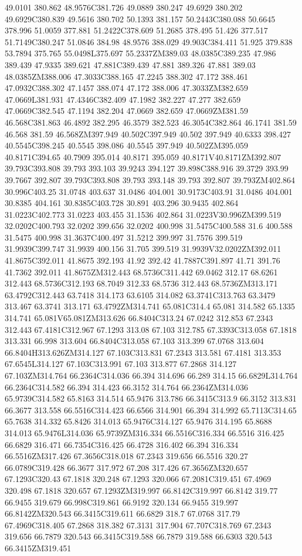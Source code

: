 49.0101 380.862 48.9576C381.726 49.0889 380.247 49.6929 380.202 49.6929C380.839 49.5616 380.702 50.1393 381.157 50.2443C380.088 50.6645 378.996 51.0059 377.881 51.2422C378.609 51.2685 378.495 51.426 377.517 51.7149C380.247 51.0846 384.98 48.9576 388.029 49.903C384.411 51.925 379.838 53.7894 375.765 55.0498L375.697 55.2337ZM389.03 48.0385C389.235 47.986 389.439 47.9335 389.621 47.881C389.439 47.881 389.326 47.881 389.03 48.0385ZM388.006 47.3033C388.165 47.2245 388.302 47.172 388.461 47.0932C388.302 47.1457 388.074 47.172 388.006 47.3033ZM382.659 47.0669L381.931 47.4346C382.409 47.1982 382.227 47.277 382.659 47.0669C382.545 47.1194 382.204 47.0669 382.659 47.0669ZM381.59 46.568C381.863 46.4892 382.295 46.3579 382.523 46.3054C382.864 46.1741 381.59 46.568 381.59 46.568ZM397.949 40.502C397.949 40.502 397.949 40.6333 398.427 40.5545C398.245 40.5545 398.086 40.5545 397.949 40.502ZM395.059 40.8171C394.65 40.7909 395.014 40.8171 395.059 40.8171V40.8171ZM392.807 39.793C393.808 39.793 393.103 39.9243 394.127 39.898C388.916 39.3729 393.99 39.7667 392.807 39.793C393.808 39.793 393.148 39.793 392.807 39.793ZM402.864 30.996C403.25 31.0748 403.637 31.0486 404.001 30.9173C403.91 31.0486 404.001 30.8385 404.161 30.8385C403.728 30.891 403.296 30.9435 402.864 31.0223C402.773 31.0223 403.455 31.1536 402.864 31.0223V30.996ZM399.519 32.0202C400.793 32.0202 399.656 32.0202 400.998 31.5475C400.588 31.6 400.588 31.5475 400.998 31.3637C400.497 31.5212 399.997 31.7576 399.519 31.9939C399.747 31.9939 400.156 31.705 399.519 31.9939V32.0202ZM392.011 41.8675C392.011 41.8675 392.193 41.92 392.42 41.7887C391.897 41.71 391.76 41.7362 392.011 41.8675ZM312.443 68.5736C311.442 69.0462 312.17 68.6261 312.443 68.5736C312.193 68.7049 312.33 68.5736 312.443 68.5736ZM313.171 63.4792C312.443 63.7418 314.173 63.6105 314.082 63.3741C313.763 63.3479 313.467 63.3741 313.171 63.4792ZM314.741 65.081C314.4 65.081 314.582 65.1335 314.741 65.081V65.081ZM313.626 66.8404C313.24 67.0242 312.853 67.2343 312.443 67.4181C312.967 67.1293 313.08 67.103 312.785 67.3393C313.058 67.1818 313.331 66.998 313.604 66.8404C313.058 67.103 313.399 67.0768 313.604 66.8404H313.626ZM314.127 67.103C313.831 67.2343 313.581 67.4181 313.353 67.6545L314.127 67.103C313.991 67.103 313.877 67.2868 314.127 67.103ZM314.764 66.2364C314.036 66.394 314.696 66.289 314.15 66.6829L314.764 66.2364C314.582 66.394 314.423 66.3152 314.764 66.2364ZM314.036 65.9739C314.582 65.8163 314.514 65.9476 313.786 66.3415C313.9 66.3152 313.831 66.3677 313.558 66.5516C314.423 66.6566 314.901 66.394 314.992 65.7113C314.65 65.7638 314.332 65.8426 314.013 65.9476C314.127 65.9476 314.195 65.8688 314.013 65.9476L314.036 65.9739ZM316.334 66.5516C316.334 66.5516 316.425 66.6829 316.471 66.7354C316.425 66.4728 316.402 66.394 316.334 66.5516ZM317.426 67.3656C318.018 67.2343 319.656 66.5516 320.27 66.0789C319.428 66.3677 317.972 67.208 317.426 67.3656ZM320.657 67.1293C320.43 67.1818 320.248 67.1293 320.066 67.2081C319.451 67.4969 320.498 67.1818 320.657 67.1293ZM319.997 66.8142C319.997 66.8142 319.77 66.9455 319.679 66.998C319.861 66.9192 320.134 66.9455 319.997 66.8142ZM320.543 66.3415C319.611 66.6829 318.7 67.0768 317.79 67.4969C318.405 67.2868 318.382 67.3131 317.904 67.707C318.769 67.2343 319.656 66.7879 320.543 66.3415C319.588 66.7879 319.588 66.6303 320.543 66.3415ZM319.451 